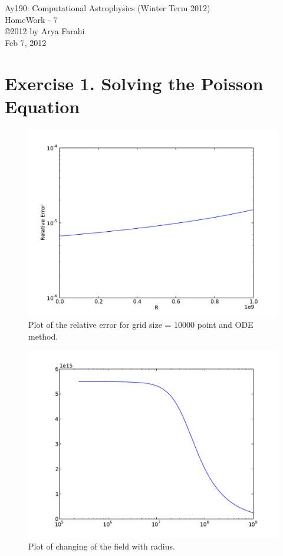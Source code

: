 \documentclass[10pt]{article}
\begin{document}
\begin{center}
{\large Ay190: Computational Astrophysics (Winter Term 2012)} \\
{\large HomeWork - 7 } \\
\copyright 2012 by Arya Farahi \\
Feb 7, 2012
\end{center}

\section{Exercise 1. Solving the Poisson Equation}


\begin{figure}[hbt]
  \begin{center}
    \includegraphics[scale=0.4]{Plots/Plot1.pdf}
    \caption{\label{fig:1} Plot of the relative error for grid size = 10000 point and ODE method.}
  \end{center}
\end{figure}

\begin{figure}[hbt]
  \begin{center}
    \includegraphics[scale=0.4]{Plots/plot3.pdf}
    \caption{\label{fig:2} Plot of changing of the field with radius.}
  \end{center}
\end{figure}
\end{document}
